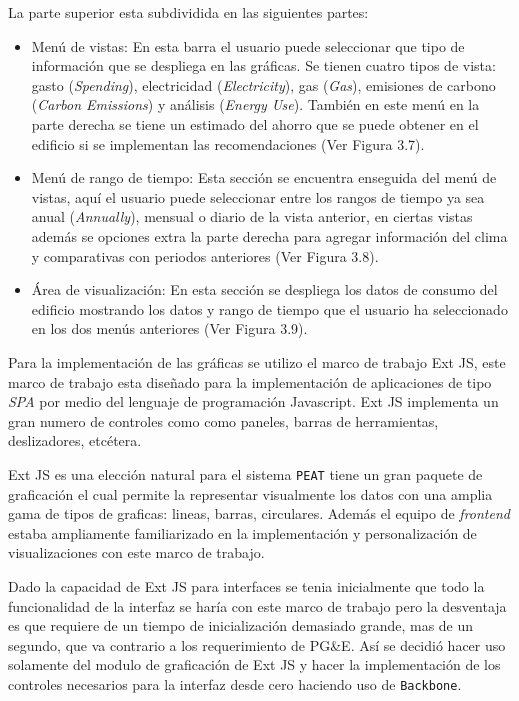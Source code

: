 La parte superior esta subdividida en las siguientes partes:
\begin{itemize}
\item Menú de vistas: En esta barra el usuario puede seleccionar
  que tipo de información que se despliega en las gráficas. Se tienen cuatro tipos
  de vista: gasto (\textit{Spending}), electricidad (\textit{Electricity}), gas
  (\textit{Gas}), emisiones de carbono (\textit{Carbon Emissions}) y análisis
  (\textit{Energy Use}). También en este menú en la parte derecha se
  tiene un estimado del ahorro que se puede obtener en el edificio
  si se implementan las recomendaciones (Ver Figura 3.7).
\item Menú de rango de tiempo: Esta sección se encuentra enseguida del menú de
  vistas, aquí el usuario puede seleccionar entre los rangos de tiempo ya sea anual
  (\textit{Annually}), mensual o diario de la vista anterior, en ciertas vistas
  además se opciones extra la parte derecha para agregar información del clima y
  comparativas con periodos anteriores (Ver Figura 3.8).
\item Área de visualización: En esta sección se despliega los datos de consumo
  del edificio mostrando los datos y rango de tiempo que el usuario ha seleccionado
  en los dos menús anteriores (Ver Figura 3.9).
\end{itemize}

Para la implementación de las gráficas se utilizo el marco de trabajo
Ext JS, este marco de trabajo esta diseñado para la implementación
de aplicaciones de tipo \textit{SPA} por medio del lenguaje de programación
Javascript. Ext JS implementa un gran numero de controles como
como paneles, barras de herramientas, deslizadores, etcétera.

Ext JS es una elección natural para el sistema \texttt{PEAT} tiene un gran
paquete de graficación el cual permite la representar visualmente los datos con una
amplia gama de tipos de graficas: lineas, barras, circulares. Además el equipo
de \textit{frontend} estaba ampliamente familiarizado en la implementación y
personalización de visualizaciones con este marco de trabajo.

Dado la capacidad de Ext JS para interfaces se tenia inicialmente
que todo la funcionalidad de la interfaz se haría con este marco de trabajo pero
la desventaja es que requiere de un tiempo de inicialización demasiado grande,
mas de un segundo, que va contrario a los requerimiento de PG\&E.
Así se decidió hacer uso solamente del modulo de graficación de Ext JS y
hacer la implementación de los controles necesarios para la interfaz desde cero
haciendo uso de \texttt{Backbone}.

